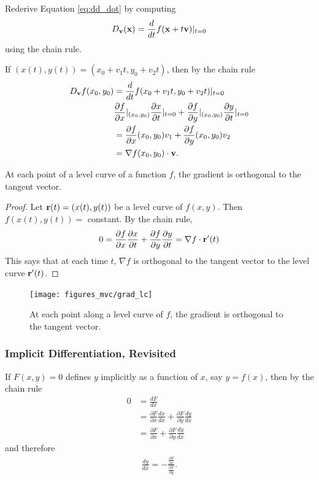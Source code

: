 \documentclass[12pt,letterpaper,reqno]{article}
\numberwithin{equation}{section}
\newcommand{\bv}{{\bf v}}
\newcommand{\bx}{{\bf x}}
\newcommand{\bbr}{{\bf r}}
\begin{document}
{\begin{exercise}
Rederive Equation \eqref{eq:dd_dot} by computing
\begin{align*}
	D_\bv(\bx)=\frac{d}{dt}f(\bx+t\bv)|_{t=0}
\end{align*}	
using the chain rule.
\end{exercise}

{\color{red}
\begin{solution}
If $(x(t),y(t))=(x_0+v_1t,y_0+v_2t)$, then by the chain rule
\begin{align*}
	D_\bv f(x_0,y_0)&=\frac{d}{dt}f(x_0+v_1t,y_0+v_2t)|_{t=0} \\
	&\frac{\partial f}{\partial x}|_{(x_0,y_0)}\frac{\partial x}{\partial t}|_{t=0}+\frac{\partial f}{\partial y}|_{(x_0,y_0)}\frac{\partial y}{\partial t}|_{t=0} \\
	&=\frac{\partial f}{\partial x}(x_0,y_0)v_1+\frac{\partial f}{\partial y}(x_0,y_0)v_2 \\
	&=\nabla f(x_0,y_0) \cdot \bv.
\end{align*}	
\end{solution}
}

\begin{thm}\label{thm:gradient_orth_to_lc}
At each point of a level curve of a function $f$, the gradient is orthogonal to the tangent vector.	
\end{thm}

\begin{proof}
	Let $\bbr(t)=(x(t),y(t))$ be a level curve of $f(x,y)$. Then $f(x(t),y(t))=$ constant. By the chain rule,
	\begin{align*}
		0=\frac{\partial f}{\partial x}\frac{\partial x}{\partial t}+\frac{\partial f}{\partial y}\frac{\partial y}{\partial t}=\nabla f \cdot \bbr'(t)
	\end{align*}
	This says that at each time $t$, $\nabla f$ is orthogonal to the tangent vector to the level curve $\bbr'(t)$.
\end{proof}

\begin{figure}[h]
	\centering
	\texttt{[image: figures\_mvc/grad\_lc]}
	\caption{At each point along a level curve of $f$, the gradient is orthogonal to the tangent vector.}
\end{figure}

\subsubsection{Implicit Differentiation, Revisited}
If $F(x,y)=0$ defines $y$ implicitly as a function of $x$, say $y=f(x)$, then by the chain rule
\begin{align*}
	0&=\frac{d F}{d x} \\
	&=\frac{\partial F}{\partial x}\frac{dx}{dx}+ \frac{\partial F}{\partial y}\frac{dy}{dx}\\
	&=\frac{\partial F}{\partial x}+ \frac{\partial F}{\partial y}\frac{dy}{dx}
\end{align*}
and therefore
\begin{align*}
	\frac{dy}{dx}=-\frac{\frac{\partial F}{\partial x}}{\frac{\partial F}{\partial y}}.
\end{align*}

}
\end{document}
